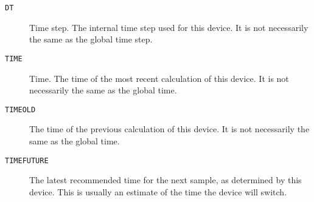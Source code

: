 \begin{description}
  
\item[{\tt DT}]
Time step.  The internal time step used for this device.  It is not
necessarily the same as the global time step.
  
\item[{\tt TIME}]
Time.  The time of the most recent calculation of this device.  It is
not necessarily the same as the global time.
  
\item[{\tt TIMEOLD}] 
The time of the previous calculation of this device.  It is not
necessarily the same as the global time.
  
\item[{\tt TIMEFUTURE}]
The latest recommended time for the next sample, as determined by this
device.  This is usually an estimate of the time the device will switch.

\end{description}
